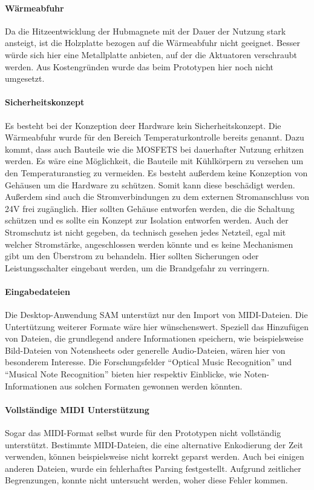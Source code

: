 \paragraph{Wärmeabfuhr}
Da die Hitzeentwicklung der Hubmagnete mit der Dauer der Nutzung stark ansteigt, ist die Holzplatte bezogen auf die Wärmeabfuhr nicht geeignet.
Besser würde sich hier eine Metallplatte anbieten, auf der die Aktuatoren verschraubt werden.
Aus Kostengründen wurde das beim Prototypen hier noch nicht umgesetzt.

\paragraph{Sicherheitskonzept}
Es besteht bei der Konzeption deer Hardware kein Sicherheitskonzept. Die Wärmeabfuhr wurde für den Bereich Temperaturkontrolle
bereits genannt. Dazu kommt, dass auch Bauteile wie die MOSFETS bei dauerhafter Nutzung erhitzen werden. Es wäre eine Möglichkeit,
die Bauteile mit Kühlkörpern zu versehen um den Temperaturanstieg zu vermeiden.\newline
Es besteht außerdem keine Konzeption von Gehäusen um die Hardware zu schützen. Somit kann diese beschädigt werden. Außerdem
sind auch die Stromverbindungen zu dem externen Stromanschluss von 24V frei zugänglich. Hier sollten Gehäuse entworfen werden,
die die Schaltung schützen und es sollte ein Konzept zur Isolation entworfen werden.\newline
Auch der Stromschutz ist nicht gegeben, da technisch gesehen jedes Netzteil, egal mit welcher Stromstärke, angeschlossen
werden könnte und es keine Mechanismen gibt um den Überstrom zu behandeln. Hier sollten Sicherungen oder Leistungsschalter
eingebaut werden, um die Brandgefahr zu verringern.

\paragraph{Eingabedateien}
Die Desktop-Anwendung \ac{SAM} unterstüzt nur den Import von \ac{MIDI}-Dateien.
Die Untertützung weiterer Formate wäre hier wünschenswert.
Speziell das Hinzufügen von Dateien, die grundlegend andere Informationen speichern, wie beispielsweise Bild-Dateien von Notensheets oder generelle Audio-Dateien, wären hier von besonderem Interesse.
Die Forschungsfelder \enquote{Optical Music Recognition} und \enquote{Musical Note Recognition} bieten hier respektiv Einblicke, wie Noten-Informationen aus solchen Formaten gewonnen werden könnten.

\paragraph{Vollständige \ac{MIDI} Unterstützung}
Sogar das \ac{MIDI}-Format selbst wurde für den Prototypen nicht vollständig unterstützt.
Bestimmte \ac{MIDI}-Dateien, die eine alternative Enkodierung der Zeit verwenden, können beispielsweise nicht korrekt geparst werden.
Auch bei einigen anderen Dateien, wurde ein fehlerhaftes Parsing festgestellt.
Aufgrund zeitlicher Begrenzungen, konnte nicht untersucht werden, woher diese Fehler kommen.

